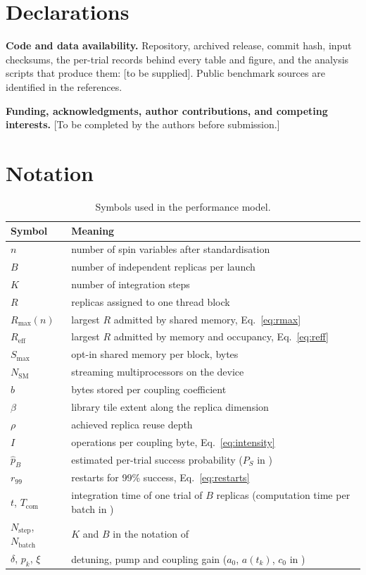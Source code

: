 \documentclass[11pt,a4paper]{article}
\begin{document}
\section*{Declarations}
\noindent\textbf{Code and data availability.} Repository, archived release, commit hash, input checksums, the per-trial records behind every table and figure, and the analysis scripts that produce them: [to be supplied]. Public benchmark sources are identified in the references.\par
\noindent\textbf{Funding, acknowledgments, author contributions, and competing interests.} [To be completed by the authors before submission.]

\appendix
\section{Notation}
\begin{table}[H]\centering\small
\caption{Symbols used in the performance model.}
\label{tab:notation}
\begin{tabular}{ll}\toprule
Symbol & Meaning \\
\midrule
$n$ & number of spin variables after standardisation \\
$B$ & number of independent replicas per launch \\
$K$ & number of integration steps \\
$R$ & replicas assigned to one thread block \\
$R_{\max}(n)$ & largest $R$ admitted by shared memory, Eq.~\eqref{eq:rmax} \\
$R_{\mathrm{eff}}$ & largest $R$ admitted by memory and occupancy, Eq.~\eqref{eq:reff} \\
$S_{\max}$ & opt-in shared memory per block, bytes \\
$N_{\mathrm{SM}}$ & streaming multiprocessors on the device \\
$b$ & bytes stored per coupling coefficient \\
$\beta$ & library tile extent along the replica dimension \\
$\rho$ & achieved replica reuse depth \\
$I$ & operations per coupling byte, Eq.~\eqref{eq:intensity} \\
$\hat p_B$ & estimated per-trial success probability ($P_S$ in \cite{goto2021}) \\
$r_{99}$ & restarts for 99\% success, Eq.~\eqref{eq:restarts} \\
$t$, $T_{\mathrm{com}}$ & integration time of one trial of $B$ replicas (computation time per batch in \cite{goto2021}) \\
$N_{\mathrm{step}}$, $N_{\mathrm{batch}}$ & $K$ and $B$ in the notation of \cite{goto2021} \\
$\delta$, $p_k$, $\xi$ & detuning, pump and coupling gain ($a_0$, $a(t_k)$, $c_0$ in \cite{goto2021}) \\
\bottomrule
\end{tabular}
\end{table}
\end{document}
